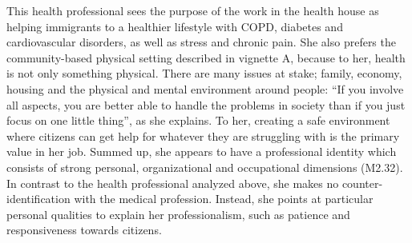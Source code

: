 This health professional sees the purpose of the work in the health house as helping immigrants to a healthier lifestyle with COPD, diabetes and cardiovascular disorders, as well as stress and chronic pain. She also prefers the community-based physical setting described in vignette A, because to her, health is not only something physical. There are many issues at stake; family, economy, housing and the physical and mental environment around people: “If you involve all aspects, you are better able to handle the problems in society than if you just focus on one little thing”, as she explains. To her, creating a safe environment where citizens can get help for whatever they are struggling with is the primary value in her job. Summed up, she appears to have a professional identity which consists of strong personal, organizational and occupational dimensions (M2.32). In contrast to the health professional analyzed above, she makes no counter-identification with the medical profession. Instead, she points at particular personal qualities to explain her professionalism, such as patience and responsiveness towards citizens.

